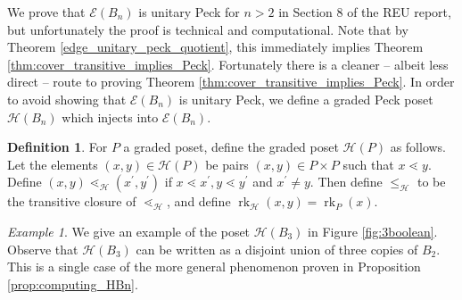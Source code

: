 \documentclass[smallextended, envcountsame, numbook]{svjour3}
\theoremstyle{plain}
\theoremstyle{definition}
\newtheorem{defn}[thm]{Definition}
\theoremstyle{remark}
\newtheorem{eg}[thm]{Example}
\numberwithin{equation}{section}
\newcommand\rk{\operatorname{rk}}
\begin{document}
We prove that $\mathcal E(B_n)$ is unitary Peck for $n > 2$ in Section 8 of the REU report, but unfortunately the proof is technical and computational. Note that by Theorem \ref{edge_unitary_peck_quotient}, this immediately implies Theorem \ref{thm:cover_transitive_implies_Peck}. Fortunately there is a cleaner -- albeit less direct -- route to proving Theorem \ref{thm:cover_transitive_implies_Peck}. In order to avoid showing that $\mathcal E(B_n)$ is unitary Peck, we define a graded Peck poset $\mathcal{H}(B_n)$ which injects into $\mathcal E(B_n)$. 
\begin{defn}
\label{defn:h_map}
For $P$ a graded poset, define the graded poset $\mathcal H(P)$ as follows.  Let the elements $(x, y) \in \mathcal H(P)$ be pairs $(x,y) \in P\times P$ such that $x \lessdot y$.  Define $(x, y) \lessdot_{\mathcal H} (x^\prime, y^\prime)$ if $x \lessdot x^\prime,y\lessdot y^\prime$ and $x^\prime \neq y$.  Then define $\leq_{\mathcal H}$ to be the transitive closure of $\lessdot_{\mathcal H}$, and define $\rk_{\mathcal H}(x, y) = \rk_P(x)$.
\end{defn}


\begin{eg}
\label{eg:3boolean}
We give an example of the poset $\mathcal H(B_3)$ in Figure \ref{fig:3boolean}. Observe that $\mathcal H(B_3)$ can be written as a disjoint union of three copies of $B_2$. This is a single case of the more general phenomenon proven in Proposition \ref{prop:computing_HBn}.
\end{eg}
\end{document}
